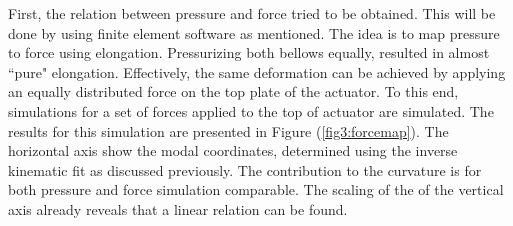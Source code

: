 First, the relation between pressure and force tried to be obtained. This will be done by using finite element software as mentioned. The idea is to map pressure to force using elongation. Pressurizing both bellows equally, resulted in almost ``pure" elongation. Effectively, the same deformation can be achieved by applying an equally distributed force on the top plate of the actuator. To this end, simulations for a set of forces applied to the top of actuator are simulated. The results for this simulation are presented in Figure (\ref{fig3:forcemap}). The horizontal axis show the modal coordinates, determined using the inverse kinematic fit as discussed previously. The contribution to the curvature is for both pressure and force simulation comparable. The scaling of the of the vertical axis already reveals that a linear relation can be found.


